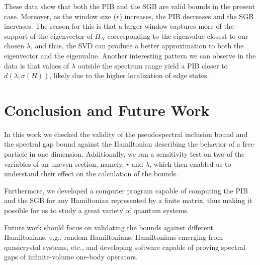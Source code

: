 \documentclass[11pt]{article}
\begin{document}
\vspace{0.5cm}
These data show that both the PIB and the SGB are valid bounds in the present case. Moreover, as the window size ($r$) increases, the PIB decreases and the SGB increases. The reason for this is that a larger window captures more of the support of the eigenvector of $H_N$ corresponding to the eigenvalue closest to our chosen $\lambda$, and thus, the SVD can produce a better approximation to both the eigenvector and the eigenvalue. Another interesting pattern we can observe in the data is that values of $\lambda$ outside the spectrum range yield a PIB closer to $d\left(\lambda, \sigma(H)\right)$, likely due to the higher localization of edge states.

\newpage

\section{Conclusion and Future Work}

In this work we checked the validity of the pseudospectral inclusion bound and the spectral gap bound against the Hamiltonian describing the behavior of a free particle in one dimension. Additionally, we ran a sensitivity test on two of the variables of an uneven section, namely, $r$ and $\lambda$, which then enabled us to understand their effect on the calculation of the bounds.

Furthermore, we developed a computer program capable of computing the PIB and the SGB for any Hamiltonian represented by a finite matrix, thus making it possible for us to study a great variety of quantum systems.

Future work should focus on validating the bounds against different Hamiltonians, e.g., random Hamiltonians, Hamiltonians emerging from quasicrystal systems, etc., and developing software capable of proving spectral gaps of infinite-volume one-body operators.

\newpage

\printbibliography
\end{document}
